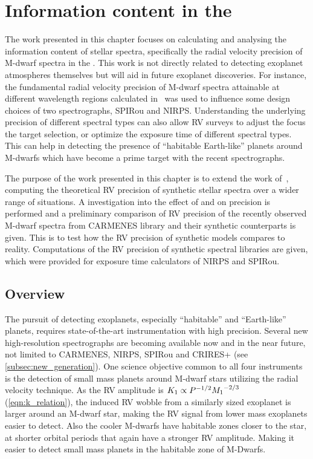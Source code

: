 
\chapter{Information content in the \nir{}}
\label{cha:nir_content}

The work presented in this chapter focuses on calculating and analysing the information content of stellar spectra, specifically the radial velocity precision of M-dwarf spectra in the \nir{}.
This work is not directly related to detecting exoplanet atmospheres themselves but will aid in future exoplanet discoveries.
For instance, the fundamental radial velocity precision of {M-dwarf} spectra attainable at different wavelength regions calculated in~\citet{figueira_radial_2016} was used to influence some design choices of two \nir{} spectrographs, {SPIRou} and {NIRPS}.
Understanding the underlying precision of different spectral types can also allow {RV} surveys to adjust the focus the target selection, or optimize the exposure time of different spectral types.
This can help in detecting the presence of ``habitable Earth-like'' planets around {M-dwarfs} which have become a prime target with the recent \nir{} spectrographs.

The purpose of the work presented in this chapter is to extend the work of~\citet{figueira_radial_2016}, computing the theoretical {RV} precision of synthetic stellar spectra over a wider range of situations.
A investigation into the effect of \Logg{} and \feh{} on precision is performed and a preliminary comparison of {RV} precision of the recently observed \nir{} {M-dwarf} spectra from {CARMENES} library and their synthetic counterparts is given.
This is to test how the {RV} precision of synthetic models compares to reality.
Computations of the {RV} precision of synthetic spectral libraries are given, which were provided for exposure time calculators of {NIRPS} and {SPIRou}. 


\section{Overview}
\label{sec:precision_overview}
The pursuit of detecting exoplanets, especially ``habitable'' and ``Earth-like'' planets, requires state-of-the-art instrumentation with high precision.
Several new high-resolution \nir{} spectrographs are becoming available now and in the near future, not limited to {CARMENES}, {NIRPS}, {SPIRou} and {CRIRES+} (see \cref{subsec:new_generation}).
One science objective common to all four instruments is the detection of small mass planets around {M-dwarf} stars utilizing the radial velocity technique.
As the {RV} amplitude is \({K}_{1}\propto {P}^{-{1/2}}{{M}_{1}}^{-2/3}\) (\cref{eqn:k_relation}), the induced {RV} wobble from a similarly sized exoplanet is larger around an M-dwarf star, making the {RV} signal from lower mass exoplanets easier to detect.
Also the cooler {M-dwarfs} have habitable zones closer to the star, at shorter orbital periods that again have a stronger {RV} amplitude.
Making it easier to detect small mass planets in the habitable zone of {M-Dwarfs}.

